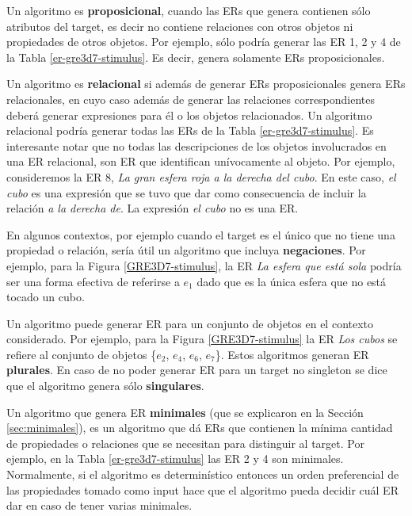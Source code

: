 Un algoritmo es {\bf proposicional}, cuando las ERs que genera contienen s\'olo atributos del target, es decir no contiene relaciones con otros objetos ni propiedades de otros objetos. Por ejemplo, s\'olo podr\'ia generar las ER 1, 2 y 4 de la Tabla \ref{er-gre3d7-stimulus}. Es decir, genera solamente ERs proposicionales.

Un algoritmo es {\bf relacional} si adem\'as de generar ERs proposicionales genera ERs relacionales, en cuyo caso adem\'as de generar las relaciones correspondientes deber\'a generar expresiones para \'el o los objetos relacionados. Un algoritmo relacional podr\'ia generar todas las ERs de la Tabla \ref{er-gre3d7-stimulus}. Es interesante notar que no todas las descripciones de los objetos involucrados en una ER relacional, son ER que identifican un\'ivocamente al objeto. Por ejemplo, consideremos la ER 8, {\it La gran esfera roja a la derecha del cubo}. En este caso, {\it el cubo} es una expresi\'on que se tuvo que dar como consecuencia de incluir la relaci\'on {\it a la derecha de}. La expresi\'on {\it el cubo} no es una ER. 

En algunos contextos, por ejemplo cuando el target es el \'unico que no tiene una propiedad o relaci\'on, ser\'ia \'util un algoritmo que incluya {\bf negaciones}. Por ejemplo, para la Figura \ref{GRE3D7-stimulus}, la ER {\it La esfera que est\'a sola} podr\'ia ser 
una forma efectiva de referirse a $e_1$ dado que es la \'unica esfera que no est\'a tocado un cubo.

Un algoritmo puede generar ER para un conjunto de objetos en el contexto considerado. Por ejemplo, para la Figura \ref{GRE3D7-stimulus} la ER {\it Los cubos} se refiere al conjunto de objetos \{$e_2$, $e_4$, $e_6$, $e_7$\}. Estos algoritmos generan ER {\bf plurales}. En caso de no poder generar ER para un target no singleton se dice que el algoritmo genera s\'olo {\bf singulares}.

Un algoritmo que genera ER {\bf minimales} (que se explicaron en la Secci\'on \ref{sec:minimales}), es un algoritmo que d\'a ERs que contienen la m\'inima cantidad de propiedades o relaciones que se necesitan para distinguir al target. Por ejemplo, en la Tabla \ref{er-gre3d7-stimulus} las ER 2 y 4 son minimales. Normalmente, si el algoritmo es determin\'istico entonces un orden preferencial de las propiedades tomado como input hace que el algoritmo pueda decidir cu\'al ER dar en caso de tener varias minimales.

